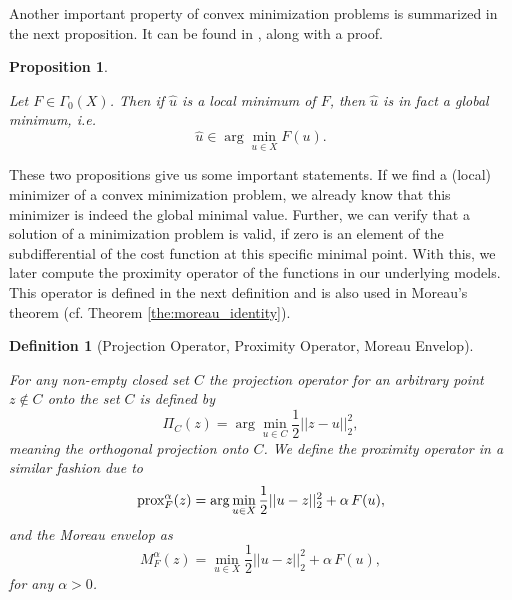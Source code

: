 \documentclass[abstracton]{scrreprt}
\newtheorem{proposition}[theorem]{Proposition}
\newtheorem{definition}[theorem]{Definition}
\begin{document}
        Another important property of convex minimization problems is summarized in the next proposition. It can be found in \cite{Rockafellar}, along with a proof.
        \begin{proposition} %
        \label{prop:global_minimum}

            Let $F \in \Gamma_{0}(X)$. Then if $\hat{u}$ is a local minimum of $F$, then $\hat{u}$ is in fact a global minimum, i.e.
                    $$
                        \hat{u} \in \arg \min_{u \in X} F(u).
                    $$
        \end{proposition}
        These two propositions give us some important statements. If we find a (local) minimizer of a convex minimization problem, we already know that this minimizer is indeed the global minimal value. Further, we can verify that a solution of a minimization problem is valid, if zero is an element of the subdifferential of the cost function at this specific minimal point. With this, we later compute the proximity operator of the functions in our underlying models. This operator is defined in the next definition and is also used in Moreau's theorem (cf. Theorem \ref{the:moreau_identity}).
        \begin{definition}[Projection Operator, Proximity Operator, Moreau Envelop] %
        \label{def:projection_operator}

            For any non-empty closed set $C$ the projection operator for an arbitrary point $z \notin C$ onto the set $C$ is defined by
                \begin{equation}
                    \Pi_{C}(z) = \arg \min_{u \in C} \frac{1}{2} ||z - u||_{2}^{2},
                \end{equation}
            meaning the orthogonal projection onto $C$. We define the proximity operator in a similar fashion due to
                \begin{equation}
                    \textnormal{prox}^{\alpha}_{F}(z) = \arg \min_{u \in X} \frac{1}{2} ||u - z||_{2}^{2} + \alpha \, F(u),
                    \label{eq:proximity_operator}
                \end{equation}
            and the Moreau envelop as
                $$
                    M^{\alpha}_{F}(z) = \min_{u \in X} \frac{1}{2} ||u - z||_{2}^{2} + \alpha \, F(u),
                $$
            for any $\alpha > 0$.
        \end{definition}
\end{document}
